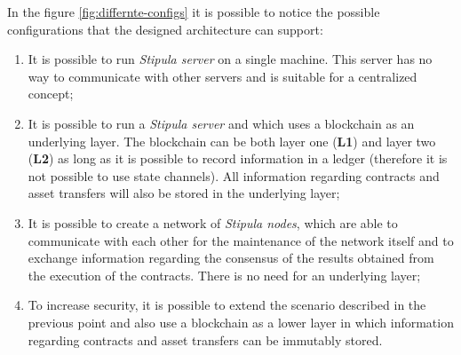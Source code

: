 In the figure \ref{fig:differnte-configs} it is possible to notice the possible configurations that the 
designed architecture can support:
\begin{enumerate}
	\item It is possible to run \textit{Stipula server} on a single machine. This server has no way to 
	communicate with other servers and is suitable for a centralized concept;
	\item It is possible to run a \textit{Stipula server} and which uses a blockchain as an underlying layer. 
	The blockchain can be both layer one (\textbf{L1}) and layer two (\textbf{L2}) as long as it is possible 
	to record information in a ledger (therefore it is not possible to use state channels). All information 
	regarding contracts and asset transfers will also be stored in the underlying layer;
	\item It is possible to create a network of \textit{Stipula nodes}, which are able to communicate with 
	each other for the maintenance of the network itself and to exchange information regarding the consensus 
	of the results obtained from the execution of the contracts. There is no need for an underlying layer;
	\item To increase security, it is possible to extend the scenario described in the previous point and 
	also use a blockchain as a lower layer in which information regarding contracts and asset transfers can 
	be immutably stored.
\end{enumerate}


